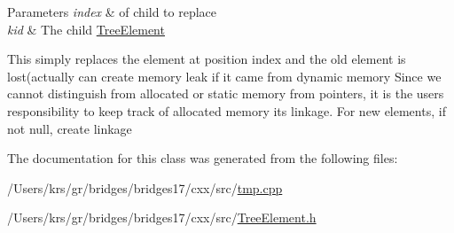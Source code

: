 \begin{DoxyParams}{Parameters}
{\em index} & of child to replace \\
\hline
{\em kid} & The child \hyperlink{classbridges_1_1_tree_element}{Tree\+Element} \\
\hline
\end{DoxyParams}
This simply replaces the element at position index and the old element is lost(actually can create memory leak if it came from dynamic memory Since we cannot distinguish from allocated or static memory from pointers, it is the user\textquotesingle{}s responsibility to keep track of allocated memory its linkage. For new elements, if not null, create linkage

The documentation for this class was generated from the following files\+:\begin{DoxyCompactItemize}
\item 
/\+Users/krs/gr/bridges/bridges17/cxx/src/\hyperlink{tmp_8cpp}{tmp.\+cpp}\item 
/\+Users/krs/gr/bridges/bridges17/cxx/src/\hyperlink{_tree_element_8h}{Tree\+Element.\+h}\end{DoxyCompactItemize}
